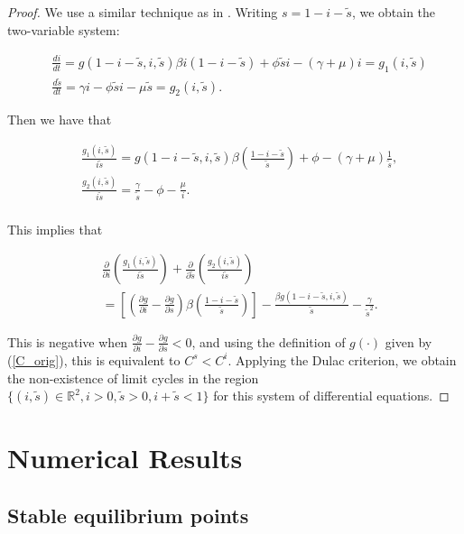 \documentclass[sn-basic]{sn-jnl}%
\theoremstyle{thmstyleone}%
\theoremstyle{thmstyletwo}%
\theoremstyle{thmstylethree}%
\newcommand{\bR}{{\mathbb{R}}}      %
\newcommand{\ws}{\widetilde{s}}
\begin{document}
\begin{proof}
We use a similar technique as in \cite{Blythe91}. Writing $s=1-i-\ws$, we obtain the two-variable system:

\begin{align}\label{model2D}
    & \frac{di}{dt}= g(1-i-\ws,i,\ws)\beta i(1-i-\ws) + \phi \ws i-(\gamma+\mu)i = g_1(i,\ws) \nonumber \\
    & \frac{d\ws}{dt}= \gamma i - \phi \ws i - \mu \ws = g_2(i,\ws).
\end{align}

Then we have that 

\begin{align*}
    &\frac{g_1(i,\ws)}{i\ws} = g(1-i-\ws,i,\ws)\beta \left(\frac{1-i-\ws}{\ws}\right) + \phi - (\gamma+\mu)\frac{1}{\ws},\\
    &\frac{g_2(i,\ws)}{i\ws} = \frac{\gamma}{\ws} - \phi  - \frac{\mu}{i}.\\
\end{align*}

This implies that

\begin{align*}
    &\frac{\partial}{\partial i}\left( \frac{g_1(i,\ws)}{i\ws} \right) + \frac{\partial}{\partial \ws}\left( \frac{g_2(i,\ws)}{i\ws}\right) \\
    &= 
    \left[\left(\frac{\partial g}{\partial i} - \frac{\partial g}{\partial s}\right)\beta \left(\frac{1-i-\ws}{\ws}\right)\right] -\frac{\beta g(1-i-\ws,i,\ws)}{\ws} - \frac{\gamma}{\ws^2}.
\end{align*}

This is negative when $\frac{\partial g}{\partial i} 
 - \frac{\partial g}{\partial s}<0$, and using the definition of $g(\cdot)$ given by (\ref{C_orig}), this is equivalent to $C^s<C^i$. Applying the Dulac criterion, we obtain the non-existence of limit cycles in the region $\{(i,\ws) \in \bR^2, i>0, \ws>0, i+\ws < 1 \}$ for this system of differential equations.
\end{proof}

\section{Numerical Results}\label{section4}

\subsection{Stable equilibrium points}
\end{document}
